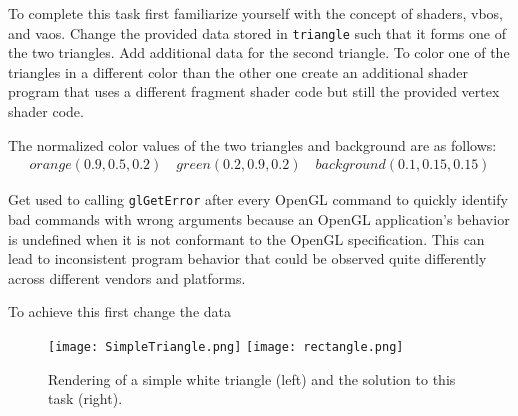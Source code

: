 \documentclass[12pt, a4paper, oneside, ngerman]{article}
\begin{document}
To complete this task first familiarize yourself with the concept of shaders, \glspl{vbo}, and \glspl{vao}. Change the provided data stored in \texttt{triangle} such that it forms one of the two triangles. Add additional data for the second triangle. To color one of the triangles in a different color than the other one create an additional shader program that uses a different fragment shader code but still the provided vertex shader code.

The normalized color values of the two triangles and background are as follows:
\begin{align*}
    orange(0.9, 0.5, 0.2) \quad
    green(0.2, 0.9, 0.2) \quad
    background(0.1, 0.15, 0.15)
\end{align*}

Get used to calling \texttt{glGetError} after every OpenGL command to quickly identify bad commands with wrong arguments because an OpenGL application's behavior is undefined when it is not conformant to the OpenGL specification. This can lead to inconsistent program behavior that could be observed quite differently across different vendors and platforms. 



To achieve this first change the data

\begin{figure}
  \centering
  \texttt{[image: SimpleTriangle.png]}
  \texttt{[image: rectangle.png]}
  \caption{Rendering of a simple white triangle (left) and the solution to this task (right).}
  \label{fig:triangles}
\end{figure}

\renewcommand{\refname}{Reading list and references}
\nocite{*}

%
%
%

\end{document}
